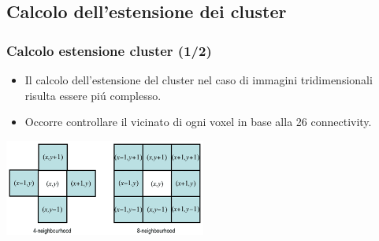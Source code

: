 \documentclass{beamer}
\begin{document}
\subsection{Calcolo dell'estensione dei cluster}

\begin{frame}
\frametitle{Calcolo estensione cluster (1/2)}
\begin{itemize}
\item Il calcolo dell'estensione del cluster nel caso di immagini tridimensionali risulta essere pi\'u complesso.
\item Occorre controllare il vicinato di ogni voxel in base alla \alert{26 connectivity}.
\end{itemize}
\center
\includegraphics[width=250px]{Images/connectivity.png}
\end{frame}
\end{document}
